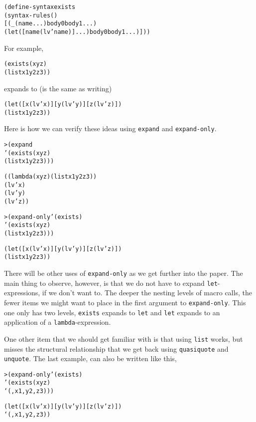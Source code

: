 \begin{alltt}
(define-syntax exists
  (syntax-rules ()
    [(_ (name ...) body0 body1 ...)
     (let ([name (lv 'name)] ...) body0 body1 ...)]))
\end{alltt}

\noindent
For example,
\begin{alltt}
(exists (x y z)
  (list x 1 y 2 z 3))
  
\end{alltt}

\noindent
expands to (is the same as writing)

\begin{alltt}
(let ([x (lv 'x)] [y (lv 'y)] [z (lv 'z)])
  (list x 1 y 2 z 3))
\end{alltt}

Here is how we can verify these ideas using \texttt{expand} and
\texttt{expand-only}.

\begin{alltt}
> (expand 
    '(exists (x y z)
       (list x 1 y 2 z 3)))

((lambda (x y z) (list x 1 y 2 z 3))
 (lv 'x)
 (lv 'y)
 (lv 'z))

> (expand-only '(exists)
    '(exists (x y z)
       (list x 1 y 2 z 3)))

(let ([x (lv 'x)] [y (lv 'y)] [z (lv 'z)])
  (list x 1 y 2 z 3))
\end{alltt}

There will be other uses of \texttt{expand-only} as we get further
into the paper.  The main thing to observe, however, is that
we do not have to expand \texttt{let}-expressions, if we don't want
to.  The deeper the nesting levels of macro calls, the fewer items
we might want to place in the first argument to \texttt{expand-only}.
This one only has two levels, \texttt{exists} expands to \texttt{let}
and \texttt{let} expands to an application of a \texttt{lambda}-expression.

One other item that we should get familiar with is that using \texttt{list}
works, but misses the structural relationship that we get back using
\texttt{quasiquote} and \texttt{unquote}.  The last example, can also be
written like this,

\begin{alltt}
> (expand-only '(exists)
    '(exists (x y z)
       `(,x 1 ,y 2 ,z 3)))

(let ([x (lv 'x)] [y (lv 'y)] [z (lv 'z)])
  `(,x 1 ,y 2 ,z 3))
\end{alltt}

